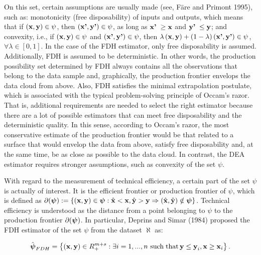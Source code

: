 On this set, certain assumptions are usually made (see, Färe and Primont 1995), such as: monotonicity (free disposability) of inputs and outputs, which means that if \(({\it \textbf{x},\textbf{y}})\in \psi\), then \(({\it \textbf{x'},\textbf{y'}})\in \psi\), as long as \({\it \textbf{x'}\; }\ge {\it \textbf{x}}\) and \({\it \textbf{y'}\; }\le {\it \textbf{y}}\); and convexity, i.e., if \(\left({\it \textbf{x}},{\it \textbf{y}}\right)\in \psi\) and \(\left({\it \textbf{x'}},{\it \textbf{y'}}\right)\in \psi\), then \(\lambda \left({\it \textbf{x}},{\it \textbf{y}}\right)+\left(1-\lambda \right)\left({\it \textbf{x'}},{\it \textbf{y'}}\right)\in \psi\), \(\forall \lambda \in \left[0,1\right]\). In the case of the FDH estimator, only free disposability is assumed. Additionally, FDH is assumed to be deterministic. In other words, the production possibility set determined by FDH always contains all the observations that belong to the data sample and, graphically, the production frontier envelops the data cloud from above. Also, FDH satisfies the minimal extrapolation postulate, which is associated with the typical problem-solving principle of Occam's razor. That is, additional requirements are needed to select the right estimator because there are a lot of possible estimators that can meet free disposability and the deterministic quality. In this sense, according to Occam's razor, the most conservative estimate of the production frontier would be that related to a surface that would envelop the data from above, satisfy free disposability and, at the same time, be as close as possible to the data cloud. In contrast, the DEA estimator requires stronger assumptions, such as convexity of the set \(\psi\).

With regard to the measurement of technical efficiency, a certain part of the set \(\psi\) is actually of interest. It is the efficient frontier or production frontier of \(\psi\), which is defined as \(\partial ({\it \boldsymbol{\psi}}):=\left\{({\it \textbf{x}},{\it \textbf{y}})\in {\it \boldsymbol{\psi}}:\hat{{\it \textbf{x}}}<{\it \textbf{x}},\hat{{\it \textbf{y}}}>{\it \textbf{y}}\Rightarrow (\hat{{\it \textbf{x}}},\hat{{\it \textbf{y}}})\notin {\it \boldsymbol{\psi}}\right\}\). Technical efficiency is understood as the distance from a point belonging to \(\psi\) to the production frontier \(\partial ({\it \boldsymbol{\psi}})\). In particular, Deprins and Simar (1984) proposed the FDH estimator of the set \(\psi\) from the dataset \(\aleph\) as:

\begin{equation} \label{(2)} 
\hat{{\it \boldsymbol{\psi}}}_{FDH} =\left\{\left({\it \textbf{x}},{\it \textbf{y}}\right)\in R_{+}^{m+s} :\exists i=1,...,n\, \, {\rm such\; that}\, {\it \textbf{y}}\le {\it \textbf{y}}_{i} ,{\it \textbf{x}}\ge {\it \textbf{x}}_{i} \right\}. 
\end{equation}

